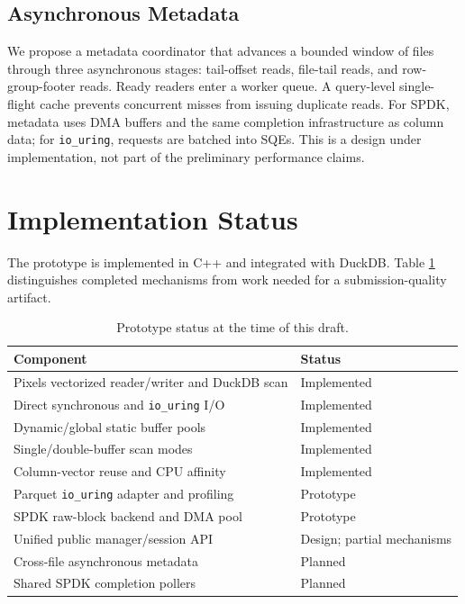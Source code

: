 \documentclass[conference]{IEEEtran}
\begin{document}
\subsection{Asynchronous Metadata}

We propose a metadata coordinator that advances a bounded window of files
through three asynchronous stages: tail-offset reads, file-tail reads, and
row-group-footer reads.  Ready readers enter a worker queue.  A query-level
single-flight cache prevents concurrent misses from issuing duplicate reads.
For SPDK, metadata uses DMA buffers and the same completion infrastructure as
column data; for \texttt{io\_uring}, requests are batched into SQEs.  This is a
design under implementation, not part of the preliminary performance claims.

\section{Implementation Status}

The prototype is implemented in C++ and integrated with DuckDB.  Table
\ref{tab:status} distinguishes completed mechanisms from work needed for a
submission-quality artifact.

\begin{table}[t]
\caption{Prototype status at the time of this draft.}
\label{tab:status}
\centering
\begin{tabular}{p{}p{}}
\toprule
Component & Status \\
\midrule
Pixels vectorized reader/writer and DuckDB scan & Implemented \\
Direct synchronous and \texttt{io\_uring} I/O & Implemented \\
Dynamic/global static buffer pools & Implemented \\
Single/double-buffer scan modes & Implemented \\
Column-vector reuse and CPU affinity & Implemented \\
Parquet \texttt{io\_uring} adapter and profiling & Prototype \\
SPDK raw-block backend and DMA pool & Prototype \\
Unified public manager/session API & Design; partial mechanisms \\
Cross-file asynchronous metadata & Planned \\
Shared SPDK completion pollers & Planned \\
\bottomrule
\end{tabular}
\end{table}
\end{document}
